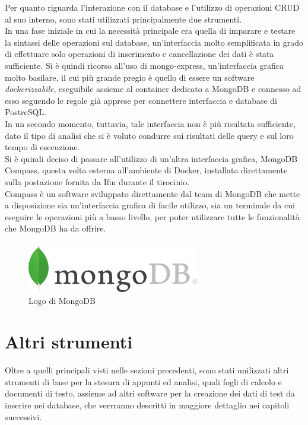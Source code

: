 \noindent Per quanto riguarda l'interazione con il database e l'utilizzo di \gls{operazioni CRUD} al suo interno, sono stati utilizzati principalmente due strumenti.\\ 
In una fase iniziale in cui la necessità principale era quella di imparare e testare la sintassi delle operazioni sul database, un'interfaccia molto semplificata in grado di effettuare solo operazioni di inserimento e cancellazione dei dati è stata sufficiente. Si è quindi ricorso all'uso di mongo-express, un'interfaccia grafica molto basilare, il cui più grande pregio è quello di essere un software \textit{dockerizzabile}, eseguibile assieme al container dedicato a MongoDB e connesso ad esso seguendo le regole già apprese per connettere interfaccia e database di PostreSQL.\\
In un secondo momento, tuttavia, tale interfaccia non è più risultata sufficiente, dato il tipo di analisi che si è voluto condurre sui risultati delle query e sul loro tempo di esecuzione.\\
Si è quindi deciso di passare all'utilizzo di un'altra interfaccia grafica, MongoDB Compass, questa volta esterna all'ambiente di Docker, installata direttamente sulla postazione fornita da Ifin durante il tirocinio.\\
Compass è un software sviluppato direttamente dal team di MongoDB che mette a disposizione sia un'interfaccia grafica di facile utilizzo, sia un terminale da cui eseguire le operazioni più a basso livello, per poter utilizzare tutte le funzionalità che MongoDB ha da offrire.

\begin{figure}[htbp]
\begin{center}
\includegraphics[height=6em]{immagini/tecnologies-logos/MongoDB-Logo.png}
\caption{Logo di MongoDB}
\label{fig:mongodb}
\end{center}
\end{figure}

\section{Altri strumenti}
Oltre a quelli principali visti nelle sezioni precedenti, sono stati unilizzati altri strumenti di base per la stesura di appunti ed analisi, quali fogli di calcolo e documenti di testo, assieme ad altri software per la creazione dei dati di test da inserire nei database, che verrranno descritti in maggiore dettaglio nei capitoli successivi.\\
